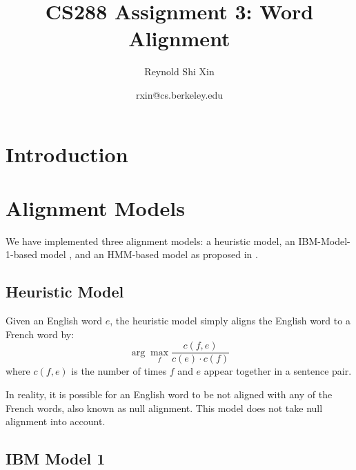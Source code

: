 \documentclass[12pt]{article}   %
\begin{document}
\title{CS288 Assignment 3: Word Alignment}   %
\author{Reynold Shi Xin}         %
\date{rxin@cs.berkeley.edu}    %
\maketitle

\begin{abstract}

\end{abstract}

\section{Introduction}


\section{Alignment Models}

We have implemented three alignment models: a heuristic model, an IBM-Model-1-based model \cite{ibm-models}, and an HMM-based model as proposed in \cite{hmm-model}.

\subsection{Heuristic Model}
Given an English word $e$, the heuristic model simply aligns the English word to a French word by:
$$ \arg\max_f \frac{c(f,e)}{c(e) \cdot c(f)} $$
where $c(f,e)$ is the number of times $f$ and $e$ appear together in a sentence pair.

In reality, it is possible for an English word to be not aligned with any of the French words, also known as null alignment. This model does not take null alignment into account.


\subsection{IBM Model 1}
\label{sec:em}
\end{document}
